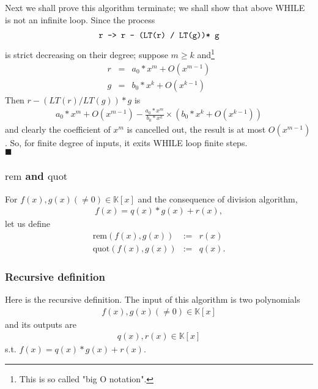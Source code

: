 \documentclass[11pt]{book}
\begin{document}
Next we shall prove this algorithm terminate; we shall show that above WHILE is not an infinite loop.
Since the process
\begin{eqnarray}
\verb| r -> r - (LT(r) / LT(g))* g |
\end{eqnarray}
is strict decreasing on their degree; suppose $m \geq k$ and\footnote{This is so called "big O notation".}
\begin{eqnarray}
r &=& a_0 * x^m + O(x^{m-1}) \\
g &=& b_0 * x^k + O(x^{k-1})
\end{eqnarray}
Then $r - (LT(r) / LT(g))* g$ is
\begin{eqnarray}
a_0 * x^m + O(x^{m-1}) - \frac{a_0 * x^m}{b_0 * x^k} \times \left( b_0 * x^k + O(x^{k-1}) \right)
\end{eqnarray}
and clearly the coefficient of $x^m$ is cancelled out, the result is at most $O(x^{m-1})$.
So, for finite degree of inputs, it exits WHILE loop finite steps.\\
$\blacksquare$

\subsubsection{$\text{rem}$ and $\text{quot}$}
For $f(x), g(x)(\neq 0) \in \mathbb{K}[x]$ and the consequence of division algorithm,
\begin{eqnarray}
f(x) = q(x) * g(x) + r(x),
\end{eqnarray}
let us define
\begin{eqnarray}
\text{rem}\left( f(x), g(x) \right) &:=& r(x) \\
\text{quot}\left( f(x), g(x) \right) &:=& q(x).
\end{eqnarray}

\subsubsection{Recursive definition}
Here is the recursive definition.
The input of this algorithm is two polynomials
\begin{eqnarray}
f(x), g(x)(\neq 0) \in \mathbb{K}[x]
\end{eqnarray}
and its outputs are
\begin{eqnarray}
q(x), r(x) \in \mathbb{K}[x]
\end{eqnarray}
s.t. $f(x) = q(x) * g(x) + r(x)$.
\end{document}
